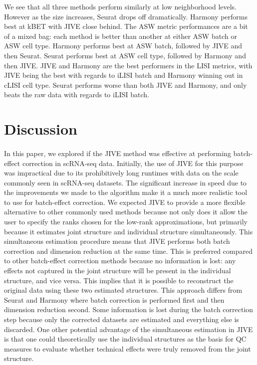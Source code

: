 \documentclass[
12pt, %
letterpaper, %
oneside, %
headinclude,footinclude, %
BCOR5mm, %
]{scrartcl}
\begin{document}
We see that all three methods perform similarly at low neighborhood levels. However as the size increases, Seurat drops off dramatically. Harmony performs best at kBET with JIVE close behind. The ASW metric performances are a bit of a mixed bag: each method is better than another at either ASW batch or ASW cell type. Harmony performs best at ASW batch, followed by JIVE and then Seurat. Seurat performs best at ASW cell type, followed by Harmony and then JIVE. JIVE and Harmony are the best performers in the LISI metrics, with JIVE being the best with regards to iLISI batch and Harmony winning out in cLISI cell type. Seurat performs worse than both JIVE and Harmony, and only beats the raw data with regards to iLISI batch.


\section{Discussion}

\paragraph*{}
In this paper, we explored if the JIVE method was effective at performing batch-effect correction in scRNA-seq data.
Initially, the use of JIVE for this purpose was impractical due to its prohibitively long runtimes with data on the scale commonly seen in scRNA-seq datasets. The significant increase in speed due to the improvements we made to the algorithm make it a much more realistic tool to use for batch-effect correction.
We expected JIVE to provide a more flexible alternative to other commonly used methods because not only does it allow the user to specify the ranks chosen for the low-rank approximations, but primarily because it estimates joint structure and individual structure simultaneously.
This simultaneous estimation procedure means that JIVE performs both batch correction and dimension reduction at the same time. This is preferred compared to other batch-effect correction methods because no information is lost: any effects not captured in the joint structure will be present in the individual structure, and vice versa. This implies that it is possible to reconstruct the original data using these two estimated structures. This approach differs from Seurat and Harmony where batch correction is performed first and then dimension reduction second. Some information is lost during the batch correction step because only the corrected datasets are estimated and everything else is discarded. 
One other potential advantage of the simultaneous estimation in JIVE is that one could theoretically use the individual structures as the basis for QC measures to evaluate whether technical effects were truly removed from the joint structure.
\end{document}
